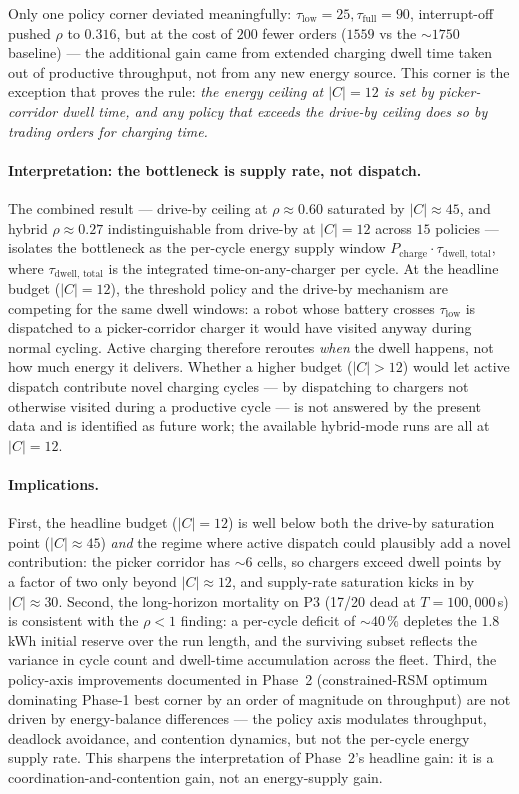 \documentclass[conference]{IEEEtran}
\begin{document}
Only one policy corner deviated meaningfully: $\tau_\text{low}=25, \tau_\text{full}=90$, interrupt-off pushed $\rho$ to $0.316$, but at the cost of $200$ fewer orders ($1559$ vs the $\sim 1750$ baseline) --- the additional gain came from extended charging dwell time taken out of productive throughput, not from any new energy source. This corner is the exception that proves the rule: \emph{the energy ceiling at $|C| = 12$ is set by picker-corridor dwell time, and any policy that exceeds the drive-by ceiling does so by trading orders for charging time.}

\paragraph{Interpretation: the bottleneck is supply rate, not dispatch.}
The combined result --- drive-by ceiling at $\rho \approx 0.60$ saturated by $|C| \approx 45$, and hybrid $\rho \approx 0.27$ indistinguishable from drive-by at $|C| = 12$ across $15$ policies --- isolates the bottleneck as the per-cycle energy supply window $P_\text{charge} \cdot \tau_\text{dwell, total}$, where $\tau_\text{dwell, total}$ is the integrated time-on-any-charger per cycle. At the headline budget ($|C| = 12$), the threshold policy and the drive-by mechanism are competing for the same dwell windows: a robot whose battery crosses $\tau_\text{low}$ is dispatched to a picker-corridor charger it would have visited anyway during normal cycling. Active charging therefore reroutes \emph{when} the dwell happens, not how much energy it delivers. Whether a higher budget ($|C| > 12$) would let active dispatch contribute novel charging cycles --- by dispatching to chargers not otherwise visited during a productive cycle --- is not answered by the present data and is identified as future work; the available hybrid-mode runs are all at $|C| = 12$.

\paragraph{Implications.}
First, the headline budget ($|C| = 12$) is well below both the drive-by saturation point ($|C| \approx 45$) \emph{and} the regime where active dispatch could plausibly add a novel contribution: the picker corridor has $\sim 6$ cells, so chargers exceed dwell points by a factor of two only beyond $|C| \approx 12$, and supply-rate saturation kicks in by $|C| \approx 30$. Second, the long-horizon mortality on P3 (17/20 dead at $T=100{,}000$\,s) is consistent with the $\rho < 1$ finding: a per-cycle deficit of $\sim 40\,\%$ depletes the $1.8$\,kWh initial reserve over the run length, and the surviving subset reflects the variance in cycle count and dwell-time accumulation across the fleet. Third, the policy-axis improvements documented in Phase~2 (constrained-RSM optimum dominating Phase-1 best corner by an order of magnitude on throughput) are not driven by energy-balance differences --- the policy axis modulates throughput, deadlock avoidance, and contention dynamics, but not the per-cycle energy supply rate. This sharpens the interpretation of Phase~2's headline gain: it is a coordination-and-contention gain, not an energy-supply gain.
\end{document}
